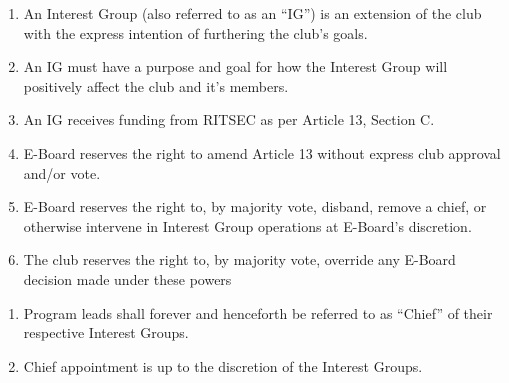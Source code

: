 

\begin{enumerate}
	\item An Interest Group (also referred to as an ``IG'') is an extension of the club
	      with the express intention of furthering the club's goals.
	\item An IG must have a purpose and goal for how the Interest Group will positively
	      affect the club and it's members.
	\item An IG receives funding from RITSEC as per Article 13, Section C.
	\item E-Board reserves the right to amend Article 13 without express club approval
	      and/or vote.
	\item E-Board reserves the right to, by majority vote, disband, remove a chief, or
	      otherwise intervene in Interest Group operations at E-Board's discretion.
	\item The club reserves the right to, by majority vote, override any E-Board decision
	      made under these powers
\end{enumerate}


\begin{enumerate}
	\item Program leads shall forever and henceforth be referred to as ``Chief'' of their
	      respective Interest Groups.
	\item Chief appointment is up to the discretion of the Interest Groups.
\end{enumerate}


